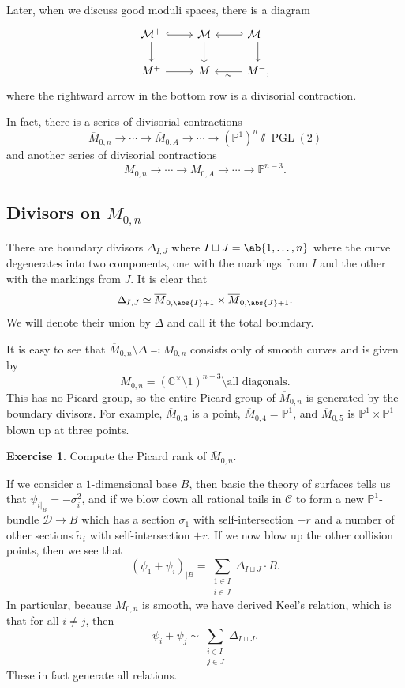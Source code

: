 \documentclass{amsart}
\theoremstyle{definition}
\newtheorem{exer}[thm]{Exercise}
\theoremstyle{remark}
\theoremstyle{plain}
\theoremstyle{definition}
\theoremstyle{remark}
\newcommand{\C}{\mathbb{C}}
\renewcommand{\P}{\mathbb{P}}
\newcommand{\mc}[1]{\mathcal{#1}}
\newcommand{\on}[1]{\operatorname{#1}}
\newcommand{\ol}[1]{\overline{#1}}
\newcommand{\1}{\mathbf{1}}
\newcommand{\2}{\mathbf{2}}
\newcommand{\3}{\mathbf{3}}
\begin{document}
Later, when we discuss good moduli spaces, there is a diagram
\begin{equation*}
\begin{tikzcd}
    \mc{M}^+ \ar[hookrightarrow]{r} \ar{d} & \mc{M} \ar{d} \ar[hookleftarrow]{r} &  \mc{M}^-  \ar{d} \\
    M^+ \ar{r} & M & M^- \ar{l}{\sim},
\end{tikzcd}
\end{equation*}
where the rightward arrow in the bottom row is a divisorial contraction.

In fact, there is a series of divisorial contractions
\[ \ol{M}_{0, n} \to \cdots \to \ol{M}_{0, A} \to \cdots \to (\P^1)^n \sslash \on{PGL}(2) \]
and another series of divisorial contractions
\[ \ol{M}_{0, n} \to \cdots \to \ol{M}_{0, A} \to \cdots \to \P^{n-3}. \]


\subsection{\texorpdfstring{Divisors on \(\ol{M}_{0,n}\)}{Divisors on M\_\{0,n\}}}%
\label{sub:Divisors on m0nbar}

There are boundary divisors \(\Delta_{I, J}\) where \(I \sqcup J = \ab\{1, \ldots, n \}\) where the curve degenerates into two components, one with the markings from \(I\) and the other with the markings from \(J\). It is clear that
\[ \Delta_{I, J} \simeq \ol{M}_{0, \abs{I}+1} \times \ol{M}_{0, \abs{J}+1}. \]
We will denote their union by \(\Delta\) and call it the total boundary.

It is easy to see that \(\ol{M}_{0,n} \setminus \Delta \eqqcolon M_{0,n}\) consists only of smooth curves and is given by
\[ M_{0,n} = (\C^{\times} \setminus 1)^{n-3} \setminus \text{all diagonals}. \]
This has no Picard group, so the entire Picard group of \(\ol{M}_{0,n}\) is generated by the boundary divisors. For example, \(\ol{M}_{0,3}\) is a point, \(\ol{M}_{0,4} = \P^1\), and \(\ol{M}_{0,5}\) is \(\P^1 \times \P^1\) blown up at three points.

\begin{exer}
    Compute the Picard rank of \(\ol{M}_{0,n}\).
\end{exer}

If we consider a \(1\)-dimensional base \(B\), then basic the theory of surfaces tells us that \(\psi_{i|_B} = -\sigma_i^2\), and if we blow down all rational tails in \(\mc{C}\) to form a new \(\P^1\)-bundle \(\mc{D} \to B\) which has a section \(\sigma_1\) with self-intersection \(-r\) and a number of other sections \(\tilde{\sigma}_i\) with self-intersection \(+r\). If we now blow up the other collision points, then we see that
\[ (\psi_1 + \psi_i )_{|B}= \sum_{\substack{1 \in I \\ i \in J}} \Delta_{I \sqcup J} \cdot B. \]
In particular, because \(\ol{M}_{0,n}\) is smooth, we have derived Keel's relation, which is that for all \(i \neq j\), then
\[ \psi_i + \psi_j \sim \sum_{\substack{i \in I \\ j \in J}} \Delta_{I \sqcup J}. \]
These in fact generate all relations.
\end{document}
